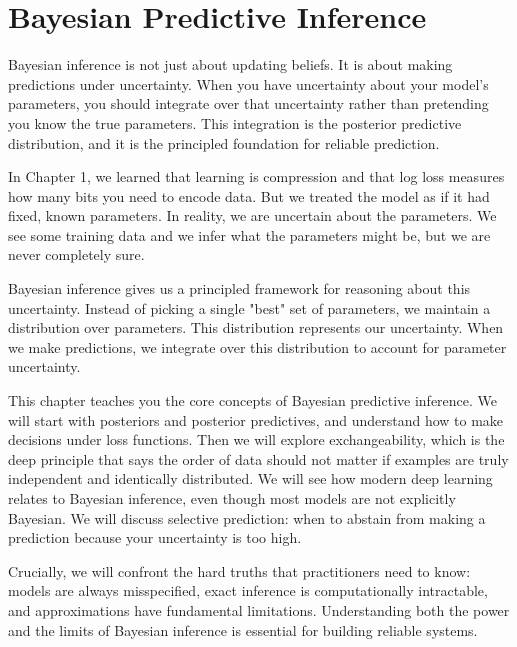 
\chapter{Bayesian Predictive Inference}

\begin{keyinsight}
Bayesian inference is not just about updating beliefs. It is about making predictions under uncertainty. When you have uncertainty about your model's parameters, you should integrate over that uncertainty rather than pretending you know the true parameters. This integration is the posterior predictive distribution, and it is the principled foundation for reliable prediction.
\end{keyinsight}

\vspace{1.5em}

In Chapter 1, we learned that learning is compression and that log loss measures how many bits you need to encode data. But we treated the model as if it had fixed, known parameters. In reality, we are uncertain about the parameters. We see some training data and we infer what the parameters might be, but we are never completely sure.

Bayesian inference gives us a principled framework for reasoning about this uncertainty. Instead of picking a single "best" set of parameters, we maintain a distribution over parameters. This distribution represents our uncertainty. When we make predictions, we integrate over this distribution to account for parameter uncertainty.

This chapter teaches you the core concepts of Bayesian predictive inference. We will start with posteriors and posterior predictives, and understand how to make decisions under loss functions. Then we will explore exchangeability, which is the deep principle that says the order of data should not matter if examples are truly independent and identically distributed. We will see how modern deep learning relates to Bayesian inference, even though most models are not explicitly Bayesian. We will discuss selective prediction: when to abstain from making a prediction because your uncertainty is too high.

Crucially, we will confront the hard truths that practitioners need to know: models are always misspecified, exact inference is computationally intractable, and approximations have fundamental limitations. Understanding both the power and the limits of Bayesian inference is essential for building reliable systems.

